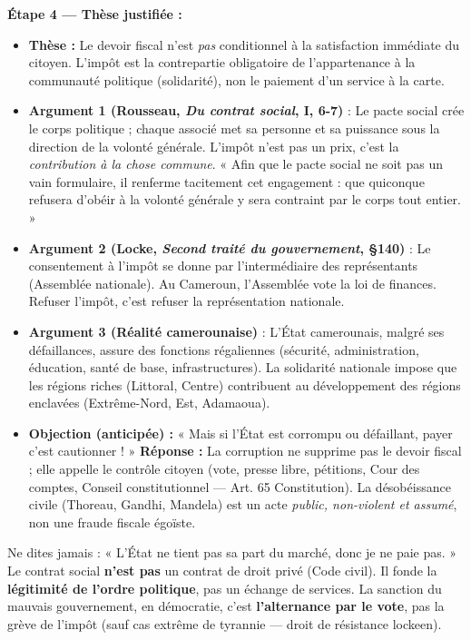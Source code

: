 \documentclass[11pt]{article}
\newcommand{\cle}[1]{{\popxbold\color{popdark}#1}}
\begin{document}
\begin{exoresolu}
\textbf{Étape 4 — Thèse justifiée :}
\begin{itemize}
    \item \textbf{Thèse :} Le devoir fiscal n'est \emph{pas} conditionnel à la satisfaction immédiate du citoyen. L'impôt est la \cle{contrepartie obligatoire} de l'appartenance à la communauté politique (solidarité), non le paiement d'un service à la carte.
    \item \textbf{Argument 1 (Rousseau, \emph{Du contrat social}, I, 6-7)} : Le pacte social crée le \cle{corps politique} ; chaque associé met sa personne et sa puissance sous la direction de la volonté générale. L'impôt n'est pas un prix, c'est la \emph{contribution à la chose commune}. « Afin que le pacte social ne soit pas un vain formulaire, il renferme tacitement cet engagement : que quiconque refusera d'obéir à la volonté générale y sera contraint par le corps tout entier. »
    \item \textbf{Argument 2 (Locke, \emph{Second traité du gouvernement}, §140)} : Le consentement à l'impôt se donne par l'intermédiaire des représentants (Assemblée nationale). Au Cameroun, l'Assemblée vote la loi de finances. Refuser l'impôt, c'est refuser la représentation nationale.
    \item \textbf{Argument 3 (Réalité camerounaise)} : L'État camerounais, malgré ses défaillances, assure des fonctions régaliennes (sécurité, administration, éducation, santé de base, infrastructures). La \cle{solidarité nationale} impose que les régions riches (Littoral, Centre) contribuent au développement des régions enclavées (Extrême-Nord, Est, Adamaoua).
    \item \textbf{Objection (anticipée) :} « Mais si l'État est corrompu ou défaillant, payer c'est cautionner ! » \textbf{Réponse :} La corruption ne supprime pas le devoir fiscal ; elle appelle le \cle{contrôle citoyen} (vote, presse libre, pétitions, Cour des comptes, Conseil constitutionnel — Art. 65 Constitution). La désobéissance civile (Thoreau, Gandhi, Mandela) est un acte \emph{public, non-violent et assumé}, non une fraude fiscale égoïste.
\end{itemize}
\end{exoresolu}

\begin{attention}
Ne dites jamais : « L'État ne tient pas sa part du marché, donc je ne paie pas. » Le contrat social \textbf{n'est pas} un contrat de droit privé (Code civil). Il fonde la \textbf{légitimité de l'ordre politique}, pas un échange de services. La sanction du mauvais gouvernement, en démocratie, c'est \textbf{l'alternance par le vote}, pas la grève de l'impôt (sauf cas extrême de tyrannie — droit de résistance lockeen).
\end{attention}
\end{document}
